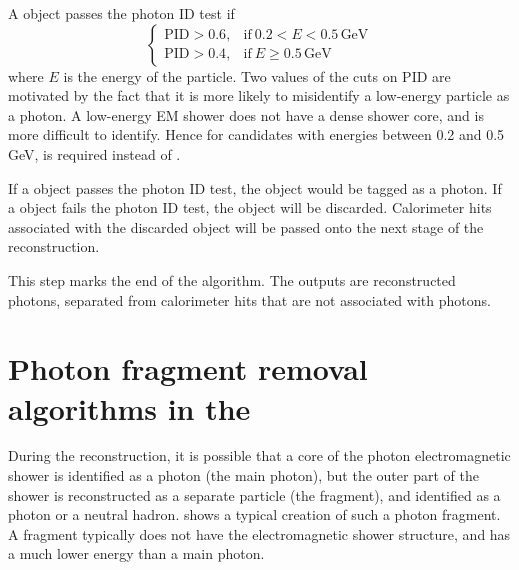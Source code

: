 A \ShowerPeak object passes the photon ID test if
\begin{equation}
\begin{cases}
  \text{PID} > 0.6, & \text{if}\ 0.2 < E < 0.5\,\text{GeV}\\
  \text{PID} > 0.4, & \text{if}\ E \geqslant 0.5\,\text{GeV}
\end{cases}
\end{equation}
where $E$ is the energy of the particle. Two values of the cuts on $\text{PID}$ are motivated by the fact that it is more likely to misidentify a low-energy particle as a photon. A low-energy EM shower does not have a dense shower core, and is more difficult to identify. Hence for candidates with energies between 0.2 and 0.5\,GeV,  is required instead of .

 If a \ShowerPeak object passes the photon ID test, the \ShowerPeak object would be tagged as a photon. If a \ShowerPeak object   fails the  photon ID test, the \ShowerPeak object  will be discarded. Calorimeter hits associated with the discarded  \ShowerPeak object will be passed onto the next stage of the reconstruction.

This step marks the end of the \PhotonReconstruction algorithm. The outputs are reconstructed photons, separated from calorimeter hits that are not associated with photons.





\section{Photon fragment removal algorithms in the \ECAL}
\label{sec:photonFragRemoval}
During the reconstruction, it is possible that a core of the photon electromagnetic shower is identified as a photon (the main photon), but the outer part of the shower is reconstructed as a separate particle (the fragment), and identified as a photon or a neutral hadron.  shows a typical creation of such a photon fragment. A fragment typically does not have the electromagnetic shower structure, and has a much lower energy than a main photon.

